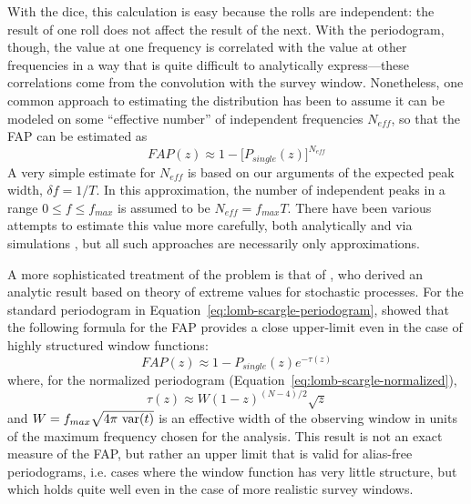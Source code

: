 \documentclass[preprint]{aastex}
\newcommand{\Eq}[1]{Equation~\ref{eq:#1}}
\newcommand{\eq}[1]{\Eq{#1}}
\newcommand{\eqlabel}[1]{\label{eq:#1}}
\begin{document}
With the dice, this calculation is easy because the rolls are independent: the
result of one roll does not affect the result of the next.
With the periodogram, though, the value at one frequency is correlated with
the value at other frequencies in a way that is quite difficult to analytically
express---these correlations come from the convolution with the survey
window.
Nonetheless, one common approach to estimating the distribution has been to
assume it can be modeled on some ``effective number'' of independent
frequencies $N_{eff}$, so that the FAP can be estimated as
\begin{equation}
  FAP(z) \approx 1 - \big[P_{single}(z)\big]^{N_{eff}}
  \eqlabel{FAP-neff}
\end{equation}
A very simple estimate for $N_{eff}$ is based on our arguments of the
expected peak width, $\delta f = 1/T$.
In this approximation, the number of independent peaks in a range
$0 \le f \le f_{max}$ is assumed to be $N_{eff} = f_{max} T$.
There have been various attempts to estimate this value more carefully,
both analytically and via simulations
\citep[see, e.g.][]{Horne86,Schwarzenberg-Czerny98,Cumming04,Frescura08},
but all such approaches are necessarily only approximations.


A more sophisticated treatment of the problem is that of \citet{Baluev2008},
who derived an analytic result based on theory of extreme values
for stochastic processes.
For the standard periodogram in \eq{lomb-scargle-periodogram},
\citet{Baluev2008} showed that the following
formula for the FAP provides a close upper-limit even in the case of
highly structured window functions:
\begin{equation}
  FAP(z) \approx 1 - P_{single}(z)e^{-\tau(z)}
  \eqlabel{FAP-baluev}
\end{equation}
where, for the normalized periodogram (\eq{lomb-scargle-normalized}),
\begin{equation}
  \tau(z) \approx W (1 - z)^{(N - 4)/2}\sqrt{z}
\end{equation}
and $W = f_{max} \sqrt{4\pi\ {\rm var}(t)}$ is an effective width of the
observing window in units of the maximum frequency chosen for the analysis.
This result is not an exact measure of the FAP, but rather an
upper limit that is valid for alias-free periodograms, {i.e.} cases
where the window function has very little structure,
but which holds quite well even in the case of more realistic survey windows.
\end{document}
